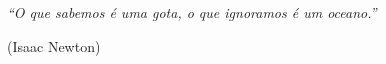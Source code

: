 \begin{dedicatoria} 
  \textit{\enquote{O que sabemos é uma gota, o que ignoramos é um oceano.}}
  
  (Isaac Newton)%
\end{dedicatoria}